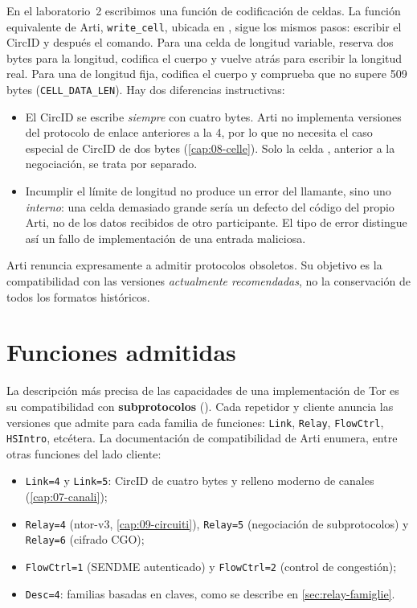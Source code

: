 En el laboratorio~2 escribimos una función de codificación de celdas. La función equivalente de Arti, \texttt{write\_cell}, ubicada en , sigue los mismos pasos: escribir el CircID y después el comando. Para una celda de longitud variable, reserva dos bytes para la longitud, codifica el cuerpo y vuelve atrás para escribir la longitud real. Para una de longitud fija, codifica el cuerpo y comprueba que no supere 509 bytes (\texttt{CELL\_DATA\_LEN}). Hay dos diferencias instructivas:
\begin{itemize}
  \item El CircID se escribe \emph{siempre} con cuatro bytes. Arti no implementa versiones del protocolo de enlace anteriores a la 4, por lo que no necesita el caso especial de CircID de dos bytes (\cref{cap:08-celle}). Solo la celda , anterior a la negociación, se trata por separado.
  \item Incumplir el límite de longitud no produce un error del llamante, sino uno \emph{interno}: una celda demasiado grande sería un defecto del código del propio Arti, no de los datos recibidos de otro participante. El tipo de error distingue así un fallo de implementación de una entrada maliciosa.
\end{itemize}
Arti renuncia expresamente a admitir protocolos obsoletos. Su objetivo es la compatibilidad con las versiones \emph{actualmente recomendadas}, no la conservación de todos los formatos históricos.

\section{Funciones admitidas}\label{sec:arti-supporto}

La descripción más precisa de las capacidades de una implementación de Tor es su compatibilidad con \textbf{subprotocolos} (). Cada repetidor y cliente anuncia las versiones que admite para cada familia de funciones: \texttt{Link}, \texttt{Relay}, \texttt{FlowCtrl}, \texttt{HSIntro}, etcétera. La documentación de compatibilidad de Arti enumera, entre otras funciones del lado cliente:
\begin{itemize}
  \item \texttt{Link=4} y \texttt{Link=5}: CircID de cuatro bytes y relleno moderno de canales (\cref{cap:07-canali});
  \item \texttt{Relay=4} (ntor-v3, \cref{cap:09-circuiti}), \texttt{Relay=5} (negociación de subprotocolos) y \texttt{Relay=6} (cifrado CGO);
  \item \texttt{FlowCtrl=1} (SENDME autenticado) y \texttt{FlowCtrl=2} (control de congestión);
  \item \texttt{Desc=4}: familias basadas en claves, como se describe en \cref{sec:relay-famiglie}.
\end{itemize}

